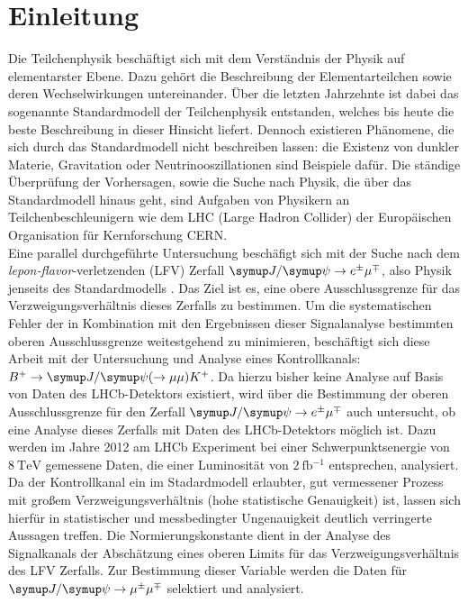 \chapter{Einleitung}
%
Die Teilchenphysik beschäftigt sich mit dem Verständnis der Physik auf elementarster Ebene. Dazu gehört die Beschreibung der Elementarteilchen sowie deren Wechselwirkungen untereinander. Über die letzten Jahrzehnte ist dabei das sogenannte Standardmodell der Teilchenphysik entstanden, welches bis heute die beste Beschreibung in dieser Hinsicht liefert. Dennoch existieren Phänomene, die sich durch das Standardmodell nicht beschreiben lassen: die Existenz von dunkler Materie, Gravitation oder Neutrinooszillationen sind Beispiele dafür. Die ständige Überprüfung der Vorhersagen, sowie die Suche nach Physik, die über das Standardmodell hinaus geht, sind Aufgaben von Physikern an Teilchenbeschleunigern wie dem LHC (Large Hadron Collider) der Europäischen Organisation für Kernforschung CERN. \\
Eine parallel durchgeführte Untersuchung beschäfigt sich mit der Suche nach dem \textit{lepon-flavor}-verletzenden (LFV) Zerfall $\signal$, also Physik jenseits des Standardmodells \cite{ba-maik}. Das Ziel ist es, eine obere Ausschlussgrenze für das Verzweigungsverhältnis dieses Zerfalls zu bestimmen. Um die systematischen Fehler der in Kombination mit den Ergebnissen
dieser Signalanalyse bestimmten oberen Ausschlussgrenze weitestgehend zu minimieren, beschäftigt sich diese Arbeit mit der Untersuchung und Analyse eines Kontrollkanals: $B^{+}\rightarrow\jpsi(\rightarrow\mu\mu)K^{+}$. Da hierzu bisher keine Analyse auf Basis von Daten des LHCb-Detektors existiert, wird über die Bestimmung der oberen Ausschlussgrenze für den Zerfall $\signal$ auch untersucht, ob eine Analyse dieses Zerfalls mit Daten des LHCb-Detektors möglich ist.
Dazu werden im Jahre 2012 am LHCb Experiment bei einer Schwerpunktsenergie von $\SI{8}{\tera\electronvolt}$ gemessene Daten, die einer Luminosität von $\SI{2}{\femto\barn^{-1}}$ entsprechen, analysiert. Da der Kontrollkanal ein im Stadardmodell erlaubter, gut vermessener Prozess mit großem Verzweigungsverhältnis (hohe statistische Genauigkeit) ist, lassen sich hierfür in statistischer und messbedingter Ungenauigkeit deutlich verringerte Aussagen treffen. Die Normierungskonstante dient in der Analyse des Signalkanals der Abschätzung eines oberen Limits für das Verzweigungsverhältnis des LFV Zerfalls. Zur Bestimmung dieser Variable werden die Daten für $\kontroll$ selektiert und analysiert.\\
